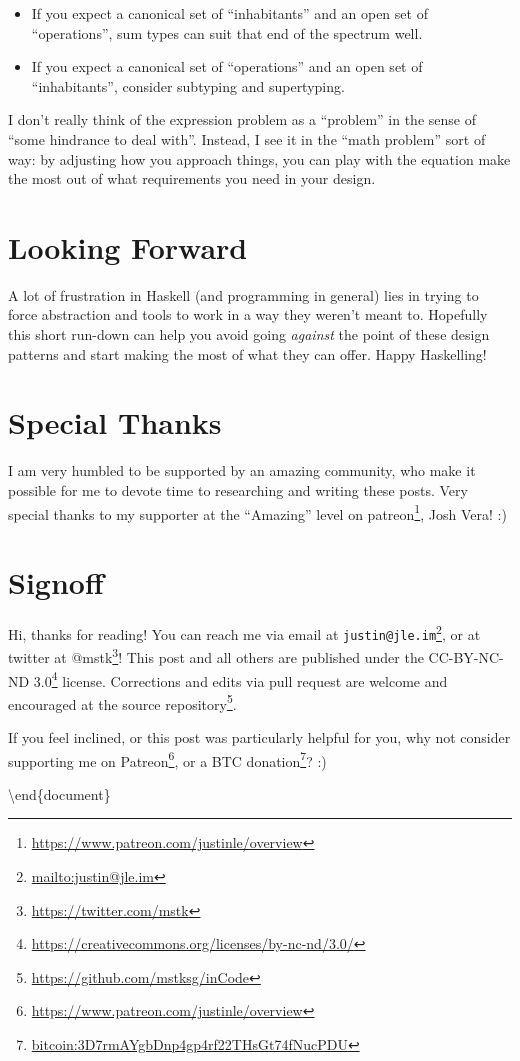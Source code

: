 \documentclass[]{article}
\renewcommand{\href}[2]{#2\footnote{\url{#1}}}
\begin{document}
\begin{itemize}
\tightlist
\item
  If you expect a canonical set of ``inhabitants'' and an open set of
  ``operations'', sum types can suit that end of the spectrum well.
\item
  If you expect a canonical set of ``operations'' and an open set of
  ``inhabitants'', consider subtyping and supertyping.
\end{itemize}

I don't really think of the expression problem as a ``problem'' in the sense of
``some hindrance to deal with''. Instead, I see it in the ``math problem'' sort
of way: by adjusting how you approach things, you can play with the equation
make the most out of what requirements you need in your design.

\section{Looking Forward}\label{looking-forward}

A lot of frustration in Haskell (and programming in general) lies in trying to
force abstraction and tools to work in a way they weren't meant to. Hopefully
this short run-down can help you avoid going \emph{against} the point of these
design patterns and start making the most of what they can offer. Happy
Haskelling!

\section{Special Thanks}\label{special-thanks}

I am very humbled to be supported by an amazing community, who make it possible
for me to devote time to researching and writing these posts. Very special
thanks to my supporter at the ``Amazing'' level on
\href{https://www.patreon.com/justinle/overview}{patreon}, Josh Vera! :)

\section{Signoff}\label{signoff}

Hi, thanks for reading! You can reach me via email at
\href{mailto:justin@jle.im}{\nolinkurl{justin@jle.im}}, or at twitter at
\href{https://twitter.com/mstk}{@mstk}! This post and all others are published
under the \href{https://creativecommons.org/licenses/by-nc-nd/3.0/}{CC-BY-NC-ND
3.0} license. Corrections and edits via pull request are welcome and encouraged
at \href{https://github.com/mstksg/inCode}{the source repository}.

If you feel inclined, or this post was particularly helpful for you, why not
consider \href{https://www.patreon.com/justinle/overview}{supporting me on
Patreon}, or a \href{bitcoin:3D7rmAYgbDnp4gp4rf22THsGt74fNucPDU}{BTC donation}?
:)

\textbackslash end\{document\}
\end{document}
